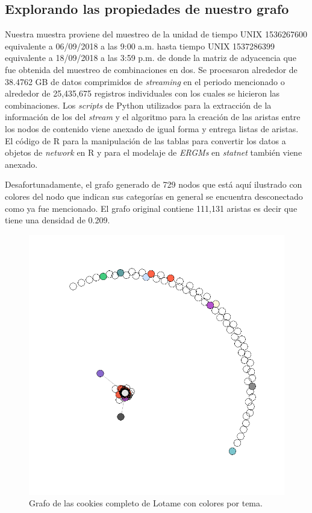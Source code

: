 \subsection{Explorando las propiedades de nuestro grafo}


Nuestra muestra proviene del muestreo de la unidad de tiempo UNIX 1536267600 equivalente a 06/09/2018 a las 9:00 a.m. hasta tiempo UNIX 1537286399 equivalente a  18/09/2018 a las 3:59 p.m. de donde la matriz de adyacencia que fue obtenida del muestreo de combinaciones en dos. Se procesaron alrededor de 38.4762 GB de datos comprimidos de \textit{streaming} en el periodo mencionado o alrededor de 25,435,675 registros individuales con los cuales se hicieron las combinaciones. Los \textit{scripts} de Python utilizados para la extracción de la información de los  del \textit{stream} y el algoritmo para la creación de las aristas entre los nodos de contenido viene anexado de igual forma y entrega listas de aristas. El código de R para la manipulación de las tablas para convertir 
los datos a objetos de \textit{network} en R y para el modelaje de \textit{ERGMs} en \textit{statnet} también viene anexado. 

Desafortunadamente, el grafo generado de 729 nodos que está aquí ilustrado con colores del nodo que indican sus categorías en general se encuentra desconectado como ya fue mencionado. El grafo original contiene 111,131 aristas es decir que tiene una densidad de 0.209. 

\begin{figure}[!ht]
\includegraphics[width=1\textwidth]{Tesis/Figures/LotameFull.png}
\caption{Grafo de las cookies completo de Lotame con colores por tema.}
\centering
\end{figure}

